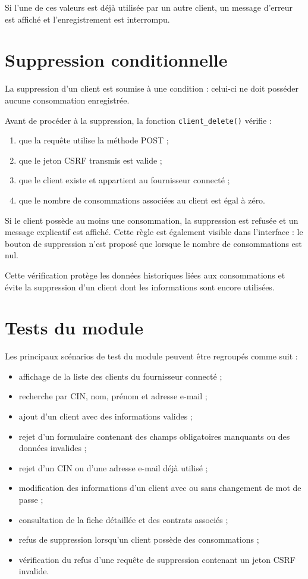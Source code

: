 Si l'une de ces valeurs est déjà utilisée par un autre client, un message d'erreur est affiché et l'enregistrement est interrompu.

\section{Suppression conditionnelle}

La suppression d'un client est soumise à une condition : celui-ci ne doit posséder aucune consommation enregistrée.

Avant de procéder à la suppression, la fonction \texttt{client\_delete()} vérifie :
\begin{enumerate}[leftmargin=*]
    \item que la requête utilise la méthode POST ;
    \item que le jeton CSRF transmis est valide ;
    \item que le client existe et appartient au fournisseur connecté ;
    \item que le nombre de consommations associées au client est égal à zéro.
\end{enumerate}

Si le client possède au moins une consommation, la suppression est refusée et un message explicatif est affiché. Cette règle est également visible dans l'interface : le bouton de suppression n'est proposé que lorsque le nombre de consommations est nul.

Cette vérification protège les données historiques liées aux consommations et évite la suppression d'un client dont les informations sont encore utilisées.

\section{Tests du module}

Les principaux scénarios de test du module peuvent être regroupés comme suit :

\begin{itemize}[leftmargin=*]
    \item affichage de la liste des clients du fournisseur connecté ;
    \item recherche par CIN, nom, prénom et adresse e-mail ;
    \item ajout d'un client avec des informations valides ;
    \item rejet d'un formulaire contenant des champs obligatoires manquants ou des données invalides ;
    \item rejet d'un CIN ou d'une adresse e-mail déjà utilisé ;
    \item modification des informations d'un client avec ou sans changement de mot de passe ;
    \item consultation de la fiche détaillée et des contrats associés ;
    \item refus de suppression lorsqu'un client possède des consommations ;
    \item vérification du refus d'une requête de suppression contenant un jeton CSRF invalide.
\end{itemize}

